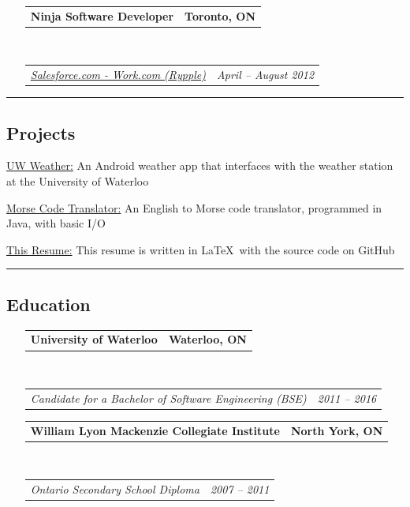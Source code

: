 \documentclass[10pt,letterpaper]{article}
\makeatletter
\newenvironment{indentsection}[1]%
{\begin{list}{}%
	{\setlength{\leftmargin}{#1}}%
	\item[]%
}
{\end{list}}
\newcommand{\headerrow}[2]
{\begin{tabular*}{\linewidth}{l@{\extracolsep{\fill}}r}
	#1 &
	#2 \\
\end{tabular*}}
\makeatother
\begin{document}
\begin{itemize}[leftmargin=*]
	\item[]
	\headerrow
		{\textbf{Ninja Software Developer}}
		{\textbf{Toronto, ON}}
	\\
	\headerrow
		{\emph{\href{https://www.work.com}{Salesforce.com - Work.com (Rypple)}}}
		{\emph{April -- August 2012}}
\end{itemize}

\hrule
\vspace{-0.4em}
\subsection*{Projects}
	\begin{indentsection}{\parindent}
	\begin{description*}
		\item[\href{https://github.com/Kapin/Waterloo-Weather}{UW Weather:}] An Android weather app that interfaces with the weather station at the University of Waterloo
		\item[\href{https://github.com/Kapin/Morse-Code-Translator}{Morse Code Translator:}] An English to Morse code translator, programmed in Java, with basic I/O
		\item[\href{https://github.com/kapin/resume}{This Resume:}] This resume is written in \LaTeX \ with the source code on GitHub
	\end{description*}
	\end{indentsection}

\hrule
\vspace{-0.4em}
\subsection*{Education}

\begin{itemize}[leftmargin=*]
	\parskip=0.1em

	\item[] 
	\headerrow
		{\textbf{University of Waterloo}}
		{\textbf{Waterloo, ON}}
	\\
	\headerrow
		{\emph{Candidate for a Bachelor of Software Engineering (BSE)}}
		{\emph{2011 -- 2016}}
		
	\item[] 
	\headerrow
		{\textbf{William Lyon Mackenzie Collegiate Institute}}
		{\textbf{North York, ON}}
	\\
	\headerrow
		{\emph{Ontario Secondary School Diploma}}
		{\emph{2007 -- 2011}}

\end{itemize}
\end{document}

